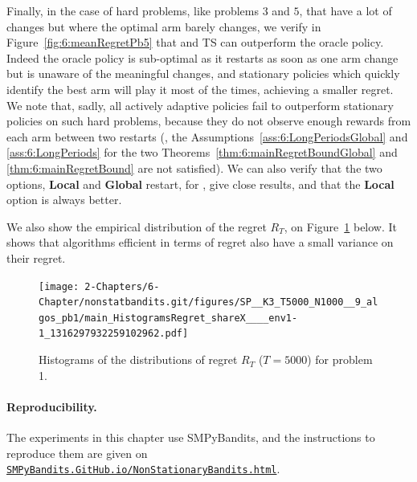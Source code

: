 Finally, in the case of hard problems, like problems $3$ and $5$, that have a lot of changes but where the optimal arm barely changes, we verify in Figure~\ref{fig:6:meanRegretPb5} that \klUCB{} and TS can outperform the oracle policy.
Indeed the oracle policy is sub-optimal as it restarts as soon as one arm change but is unaware of the meaningful changes, and stationary policies which quickly identify the best arm will play it most of the times, achieving a smaller regret.
We note that, sadly, all actively adaptive policies fail to outperform stationary policies on such hard problems, because they do not observe enough rewards from each arm between two restarts (\ie, the Assumptions~\ref{ass:6:LongPeriodsGlobal} and \ref{ass:6:LongPeriods} for the two Theorems~\ref{thm:6:mainRegretBoundGlobal} and \ref{thm:6:mainRegretBound} are not satisfied).
We can also verify that the two options, \textbf{Local} and \textbf{Global} restart, for \GLRklUCB, give close results, and that the \textbf{Local} option is always better.

We also show the empirical distribution of the regret $R_T$, on Figure~\ref{fig:6:histogramRegretPb1} below.
It shows that algorithms efficient in terms of regret also have a small variance on their regret.

\begin{figure}[h!]  %
    \centering
    \texttt{[image: 2-Chapters/6-Chapter/nonstatbandits.git/figures/SP\_\_K3\_T5000\_N1000\_\_9\_algos\_pb1/main\_HistogramsRegret\_shareX\_\_\_\_env1-1\_1316297932259102962.pdf]}
    \caption{Histograms of the distributions of regret $R_T$ ($T=5000$) for problem 1.}
    \label{fig:6:histogramRegretPb1}
\end{figure}


\paragraph{Reproducibility.}
%
The experiments in this chapter use SMPyBandits,
and the instructions to reproduce them are given on \href{https://SMPyBandits.GitHub.io/NonStationaryBandits.html}{\texttt{SMPyBandits.GitHub.io/NonStationaryBandits.html}}.


